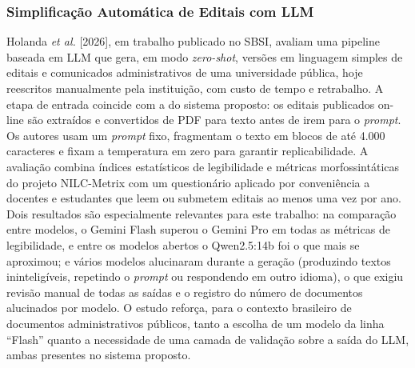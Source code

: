 \documentclass[12pt]{article}
\begin{document}
  \subsubsection{Simplificação Automática de Editais com LLM}
  Holanda \emph{et al.} [2026], em trabalho publicado no SBSI, avaliam uma pipeline baseada em LLM que gera, em modo \emph{zero-shot}, versões em linguagem simples de editais e comunicados administrativos de uma universidade pública, hoje reescritos manualmente pela instituição, com custo de tempo e retrabalho. A etapa de entrada coincide com a do sistema proposto: os editais publicados on-line são extraídos e convertidos de PDF para texto antes de irem para o \emph{prompt}. Os autores usam um \emph{prompt} fixo, fragmentam o texto em blocos de até 4.000 caracteres e fixam a temperatura em zero para garantir replicabilidade. A avaliação combina índices estatísticos de legibilidade e métricas morfossintáticas do projeto NILC-Metrix com um questionário aplicado por conveniência a docentes e estudantes que leem ou submetem editais ao menos uma vez por ano. Dois resultados são especialmente relevantes para este trabalho: na comparação entre modelos, o Gemini Flash superou o Gemini Pro em todas as métricas de legibilidade, e entre os modelos abertos o Qwen2.5:14b foi o que mais se aproximou; e vários modelos alucinaram durante a geração (produzindo textos ininteligíveis, repetindo o \emph{prompt} ou respondendo em outro idioma), o que exigiu revisão manual de todas as saídas e o registro do número de documentos alucinados por modelo. O estudo reforça, para o contexto brasileiro de documentos administrativos públicos, tanto a escolha de um modelo da linha ``Flash'' quanto a necessidade de uma camada de validação sobre a saída do LLM, ambas presentes no sistema proposto.
\end{document}
